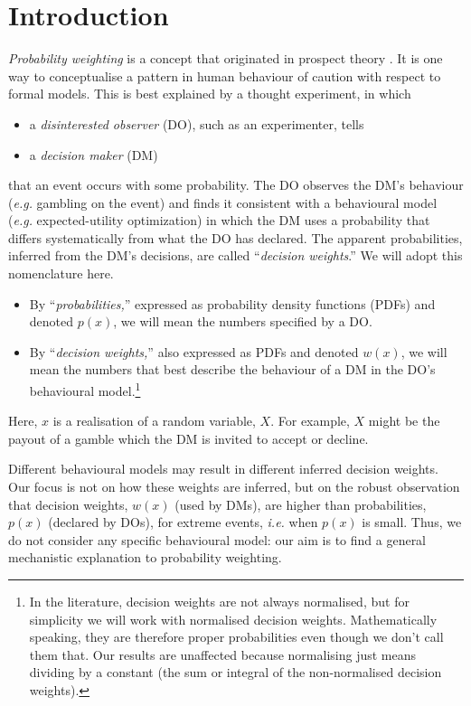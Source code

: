 \documentclass[a4paper, 12pt]{article}
\newcommand{\bi}{\begin{itemize}}
\newcommand{\ei}{\end{itemize}}
\newcommand{\ie}{\textit{i.e.}\xspace}
\newcommand{\eg}{\textit{e.g.}\xspace}
\begin{document}
\section{Introduction}
\textit{Probability weighting} is a concept that originated in prospect theory \parencite{KahnemanTversky1979,TverskyKahneman1992}. It is one way to conceptualise a pattern in human behaviour of caution with respect to formal models.
This is best explained by a thought experiment, in which  
\bi
	\item a \textit{disinterested observer} (DO), such as an experimenter, tells
	\item a \textit{decision maker} (DM)
\ei
that an event occurs with some probability. The DO observes the DM's behaviour (\eg gambling on the event) and finds it consistent with a behavioural model (\eg expected-utility optimization) in which the DM uses a probability that differs systematically from what the DO has declared. The apparent probabilities, inferred from the DM's decisions, are called ``\textit{decision weights}.'' We will adopt this nomenclature here.
% 
\bi
	\item By ``\textit{probabilities,}'' expressed as probability density functions (PDFs) and denoted $p(x)$, we will mean the numbers specified by a DO.
	\item By ``\textit{decision weights,}'' also expressed as PDFs and denoted $w(x)$, we will mean the numbers that best describe the behaviour of a DM in the DO's behavioural model.\footnote{In the literature, decision weights are not always normalised, but for simplicity we will work with normalised decision weights. Mathematically speaking, they are therefore proper probabilities even though we don't call them that. Our results are unaffected because normalising just means dividing by a constant (the sum or integral of the non-normalised decision weights).}
\ei
Here, $x$ is a realisation of a random variable, $X$. For example, $X$ might be the payout of a gamble which the DM is invited to accept or decline.

Different behavioural models may result in different inferred decision weights. Our focus is not on how these weights are inferred, but on the robust observation that decision weights, $w(x)$ (used by DMs), are higher than probabilities, $p(x)$ (declared by DOs), for extreme events, \ie when $p(x)$ is small. Thus, we do not consider any specific behavioural model: our aim is to find a general mechanistic explanation to probability weighting.
\end{document}
